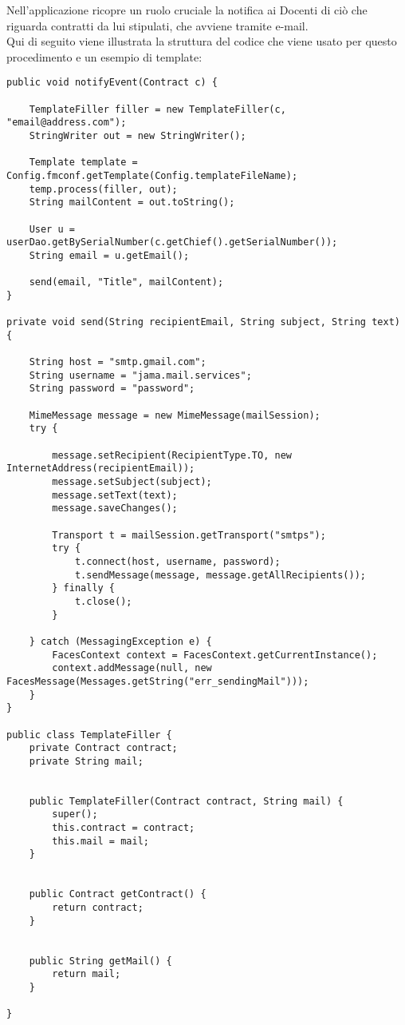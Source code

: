 Nell'applicazione ricopre un ruolo cruciale la notifica ai Docenti di ciò che riguarda contratti da lui stipulati, che avviene tramite e-mail.\\
Qui di seguito viene illustrata la struttura del codice che viene usato per questo procedimento e un esempio di template:

\begin{lstlisting}
public void notifyEvent(Contract c) {
	
	TemplateFiller filler = new TemplateFiller(c, "email@address.com");
	StringWriter out = new StringWriter();

	Template template = Config.fmconf.getTemplate(Config.templateFileName);
	temp.process(filler, out);
	String mailContent = out.toString();

	User u = userDao.getBySerialNumber(c.getChief().getSerialNumber());
	String email = u.getEmail();

	send(email, "Title", mailContent);
}

private void send(String recipientEmail, String subject, String text) {

	String host = "smtp.gmail.com";
	String username = "jama.mail.services";
	String password = "password";

	MimeMessage message = new MimeMessage(mailSession);
	try {

		message.setRecipient(RecipientType.TO, new InternetAddress(recipientEmail));
		message.setSubject(subject);
		message.setText(text);
		message.saveChanges();

		Transport t = mailSession.getTransport("smtps");
		try {
			t.connect(host, username, password);
			t.sendMessage(message, message.getAllRecipients());
		} finally {
			t.close();
		}

	} catch (MessagingException e) {
		FacesContext context = FacesContext.getCurrentInstance();
		context.addMessage(null, new FacesMessage(Messages.getString("err_sendingMail")));
	}
}

public class TemplateFiller {
	private Contract contract;
	private String mail;


	public TemplateFiller(Contract contract, String mail) {
		super();
		this.contract = contract;
		this.mail = mail;
	}


	public Contract getContract() {
		return contract;
	}


	public String getMail() {
		return mail;
	}

}
\end{lstlisting}

